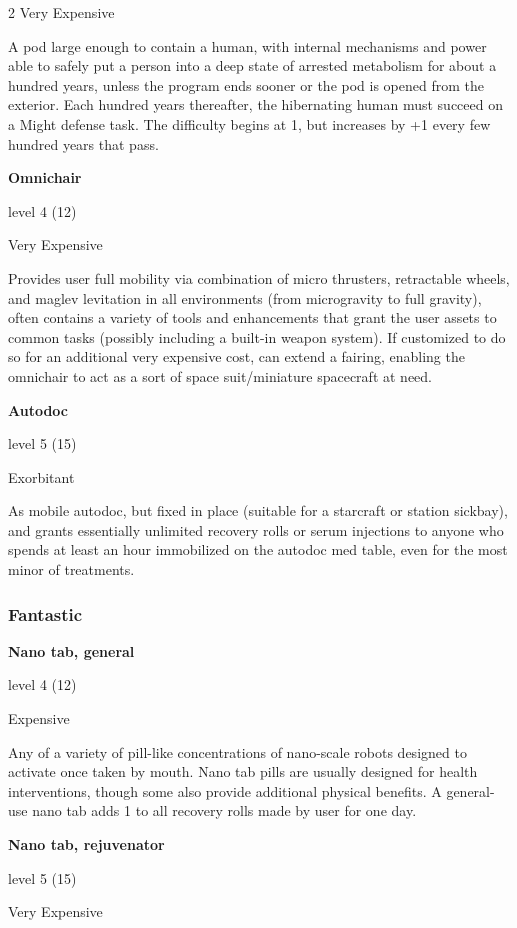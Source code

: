 \begin{multicols}{2}
Very Expensive 

A pod large enough to contain a human, with internal mechanisms and power able to safely put a person into a deep state of arrested metabolism for about a hundred years, unless the program ends sooner or the pod is opened from the exterior. Each hundred years thereafter, the hibernating human must succeed on a Might defense task. The difficulty begins at 1, but increases by +1 every few hundred years that pass. 

\textbf{Omnichair} 

level 4 (12) 

Very Expensive 

Provides user full mobility via combination of micro thrusters, retractable wheels, and maglev levitation in all environments (from microgravity to full gravity), often contains a variety of tools and enhancements that grant the user assets to common tasks (possibly including a built-in weapon system). If customized to do so for an additional very expensive cost, can extend a fairing, enabling the omnichair to act as a sort of space suit/miniature spacecraft at need. 

\textbf{Autodoc} 

level 5 (15) 

Exorbitant 

As mobile autodoc, but fixed in place (suitable for a starcraft or station sickbay), and grants essentially unlimited recovery rolls or serum injections to anyone who spends at least an hour immobilized on the autodoc med table, even for the most minor of treatments.

\subsubsection{Fantastic}

\textbf{Nano tab, general} 

level 4 (12) 

Expensive 

Any of a variety of pill-like concentrations of nano-scale robots designed to activate once taken by mouth. Nano tab pills are usually designed for health interventions, though some also provide additional physical benefits. A general-use nano tab adds 1 to all recovery rolls made by user for one day. 

\textbf{Nano tab, rejuvenator} 

level 5 (15) 

Very Expensive


\end{multicols}
